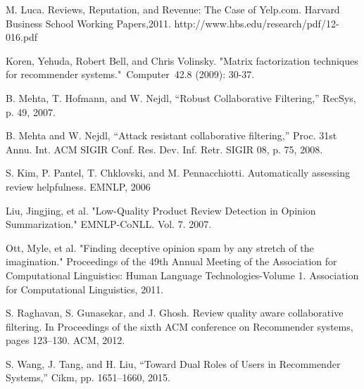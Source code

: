 \documentclass[master,english,final]{kaist-ucs}
\begin{document}
\begin{thebibliography}{00}


 M. Luca. Reviews, Reputation, and Revenue: The Case of Yelp.com. Harvard Business School Working Papers,2011. http://www.hbs.edu/research/pdf/12-016.pdf

 Koren, Yehuda, Robert Bell, and Chris Volinsky. "Matrix factorization techniques for recommender systems." Computer 42.8 (2009): 30-37.

 B. Mehta, T. Hofmann, and W. Nejdl, “Robust Collaborative Filtering,” RecSys, p. 49, 2007.

 B. Mehta and W. Nejdl, “Attack resistant collaborative filtering,” Proc. 31st Annu. Int. ACM SIGIR Conf. Res. Dev. Inf. Retr. SIGIR 08, p. 75, 2008.

 S. Kim, P. Pantel, T. Chklovski, and M. Pennacchiotti. Automatically assessing review helpfulness. EMNLP, 2006

 Liu, Jingjing, et al. "Low-Quality Product Review Detection in Opinion Summarization." EMNLP-CoNLL. Vol. 7. 2007.

 Ott, Myle, et al. "Finding deceptive opinion spam by any stretch of the imagination." Proceedings of the 49th Annual Meeting of the Association for Computational Linguistics: Human Language Technologies-Volume 1. Association for Computational Linguistics, 2011.

 S. Raghavan, S. Gunasekar, and J. Ghosh. Review quality aware collaborative filtering. In Proceedings of the sixth ACM conference on Recommender systems, pages 123–130. ACM, 2012.

 S. Wang, J. Tang, and H. Liu, “Toward Dual Roles of Users in Recommender Systems,” Cikm, pp. 1651–1660, 2015.


\end{thebibliography}
\end{document}
